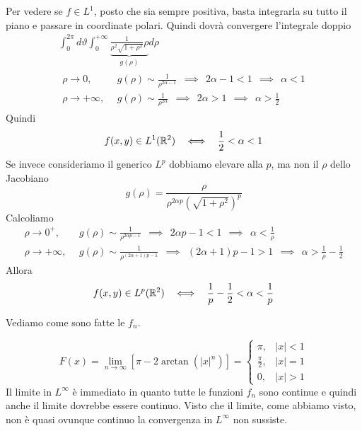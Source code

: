 Per vedere se $f\in L^{1}$, posto che sia sempre positiva, basta integrarla su tutto il piano e passare in coordinate polari. Quindi dovrà convergere l'integrale doppio
\begin{gather*}
\int ^{2\pi }_{0} d\vartheta \int ^{ + \infty }_{0}\underbrace{\frac{1}{\rho ^{2}\sqrt{1 + \rho ^{2}}} \rho }_{g(\rho)} d\rho \\
\begin{aligned}
\rho \rightarrow 0, & \ \ g(\rho)\sim \frac{1}{\rho ^{2\alpha - 1}} \ \ \implies \ \ 2\alpha - 1 < 1\ \ \implies \ \ \alpha < 1\\
\rho \rightarrow + \infty , & \ \ g(\rho)\sim \frac{1}{\rho ^{2\alpha }} \ \ \implies \ \ 2\alpha  > 1\ \ \implies \ \ \alpha  > \frac{1}{2}
\end{aligned}
\end{gather*}
Quindi
\begin{equation*}
f(x,y)\in L^{1} (\RR ^{2})\ \ \iff \ \ \frac{1}{2} < \alpha < 1
\end{equation*}
Se invece consideriamo il generico $L^{p}$ dobbiamo elevare alla $p$, ma non il $\rho $ dello Jacobiano
\begin{equation*}
g(\rho) = \frac{\rho }{\rho ^{2\alpha p}\left(\sqrt{1 + \rho ^{2}}\right)^{p}}
\end{equation*}
Calcoliamo
\begin{equation*}
\begin{aligned}
\rho \rightarrow 0^{ + } , & \ \ g(\rho)\sim \frac{1}{\rho ^{2\alpha p - 1}} \ \ \implies \ \ 2\alpha p - 1 < 1\ \ \implies \ \ \alpha < \frac{1}{\rho }\\
\rho \rightarrow + \infty , & \ \ g(\rho)\sim \frac{1}{\rho ^{(2\alpha + 1)p - 1}} \ \ \implies \ \ (2\alpha + 1)p - 1 > 1\ \ \implies \ \ \alpha  > \frac{1}{\rho } - \frac{1}{2}
\end{aligned}
\end{equation*}
Allora
\begin{equation*}
f(x,y)\in L^{p} (\RR ^{2})\ \ \iff \ \ \frac{1}{p} - \frac{1}{2} < \alpha < \frac{1}{p}
\end{equation*}
\Soluzione

Vediamo come sono fatte le $f_{n}$.

\begin{equation*}
F(x) = \lim _{n\rightarrow \infty }\left[ \pi - 2\arctan (|x|^{n})\right] = 
\begin{cases}
\pi , & |x| < 1\\
\frac{\pi }{2} , & |x| = 1\\
0, & |x| > 1
\end{cases}
\end{equation*}
Il limite in $L^{\infty }$ è immediato in quanto tutte le funzioni $f_{n}$ sono continue e quindi anche il limite dovrebbe essere continuo. Visto che il limite, come abbiamo visto, non è quasi ovunque continuo la convergenza in $L^{\infty }$ non sussiste.

